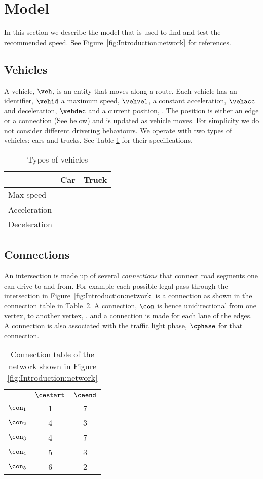 \section{Model}
In this section we describe the model that is used to find and test the recommended speed.
See Figure~\ref{fig:Introduction:network} for references.

\subsection{Vehicles}
A vehicle, $\veh$, is an entity that moves along a route.
Each vehicle has an identifier, $\vehid$ a maximum speed, $\vehvel$, a constant acceleration, $\vehacc$ and deceleration, $\vehdec$ and a current position, \vehpos. The position is either an edge or a connection (See below) and is updated as vehicle moves.
For simplicity we do not consider different drivering behaviours.
We operate with two types of vehicles: cars and trucks. See Table \ref{table.vehicleTypes} for their specifications.
\begin{table}
\centering
\begin{tabular}{|l|l|l|}\hline
				& Car 	& Truck \\\hline
Max speed 		& 		& \\\hline
Acceleration 	&		& \\\hline
Deceleration 	&		& \\\hline
\end{tabular}
\caption{Types of vehicles}\label{table.vehicleTypes}
\end{table}

\subsection{Connections}
An intersection is made up of several \textit{connections} that connect road segments one can drive to and from.
For example each possible legal pass through the intersection in Figure~\ref{fig:Introduction:network} is a connection as shown in the connection table in Table~\ref{tab:Introduction:connectionTable}. 
A connection, $\con$ is hence unidirectional from one vertex, \cestart to another vertex, \ceend, and a connection is made for each lane of the edges.
A connection is also associated with the traffic light phase, $\cphase$ for that connection.
\begin{table}[h]
\centering
\begin{tabular}{|l|c|c|}
\hline
&$\cestart$ & $\ceend$ \\ \hline
$\con_1$ & 1 & 7 \\ \hline
$\con_2$ & 4 & 3 \\ \hline
$\con_3$ & 4 & 7 \\ \hline
$\con_4$ & 5 & 3 \\ \hline
$\con_5$ & 6 & 2 \\ \hline
\end{tabular}
\caption{Connection table of the network shown in Figure \ref{fig:Introduction:network} }
\label{tab:Introduction:connectionTable}
\end{table}

